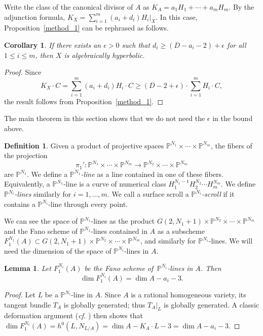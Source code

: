 \documentclass[10pt,a4paper]{article}
\numberwithin{equation}{section}
\newtheorem{lemma}[theorem]{Lemma}
\newtheorem{corollary}[theorem]{Corollary}
\theoremstyle{definition}
\newtheorem{definition}[theorem]{Definition}
\theoremstyle{remark}
\renewcommand{\P}{\mathbb{P}}
\newcommand{\lra}{\longrightarrow}
\begin{document}
    Write the class of the canonical divisor of $A$ as $K_A = a_1H_1 + \cdots + a_mH_m$. By the adjunction formula, $K_X = \sum_{i=1}^m (a_i+d_i)H_i|_X$. In this case, Proposition~\ref{method_1} can be rephrased as follows.

\begin{corollary}\label{cor_method_1}
If there exists an $\epsilon > 0$ such that $d_i\ge (D-a_i-2) + \epsilon$ for all $1\le i\le m$, then $X$ is algebraically hyperbolic.
\end{corollary}
\begin{proof}
    Since 
    \[ K_{X}\cdot C = \sum_{i=1}^m (a_i+d_i)H_i\cdot C\ge (D-2+\epsilon)\cdot \sum_{i=1}^m H_i\cdot C, \]
    the result follows from Proposition~\ref{method_1}.
\end{proof}

The main theorem in this section shows that we do not need the $\epsilon$ in the bound above. 

\begin{definition}
    Given a product of projective spaces $\P^{N_1}\times \cdots \times \P^{N_m}$, the fibers of the projection
    \[ \pi_1'\colon \P^{N_1}\times \cdots \times \P^{N_m}\lra \P^{N_2}\times \cdots \times \P^{N_m} \]
    are $\P^{N_1}$. We define a \textit{$\P^{N_1}$-line} as a line contained in one of these fibers. Equivalently, a $\P^{N_1}$-line is a curve of numerical class $H_1^{N_1-1}H_2^{N_2}\cdots H_m^{N_m}$. We define \textit{$\P^{N_i}$-lines} similarly for $i=1,\hdots , m$. We call a surface scroll a \textit{$\P^{N_i}$-scroll} if it contains a $\P^{N_i}$-line through every point.
\end{definition}

We can see the space of $\P^{N_1}$-lines as the product 
$G(2,N_1+1)\times \P^{N_2}\times \cdots \times \P^{N_m}$ and the Fano scheme of $\P^{N_1}$-lines contained in $A$ as a subscheme $F_1^{N_1}(A)\subset G(2,N_1+1)\times \P^{N_2}\times \cdots \times \P^{N_m}$, and similarly for $\P^{N_i}$-lines. We will need the dimension of the space of $\P^{N_i}$-lines in $A$.

\begin{lemma}\label{dim_lines_A}
    Let $F_1^{N_i}(A)$ be the Fano scheme of\, $\P^{N_i}$-lines in $A$. Then 
    \[ \dim F_1^{N_i}(A) = \dim A - a_i - 3. \]
\end{lemma}
\begin{proof}
    Let $L$ be a $\P^{N_i}$-line in $A$. Since $A$ is a rational homogeneous variety, its tangent bundle $T_A$ is globally generated; thus $T_A|_L$ is globally generated. A classic deformation argument  (\textit{cf.} \cite[Theorem 2.6]{HDAG}) then shows that $\dim F_1^{N_i}(A) = h^0(L, N_{L/A}) = \dim A - K_A\cdot L - 3 = \dim A - a_i - 3$.
\end{proof}
\end{document}
